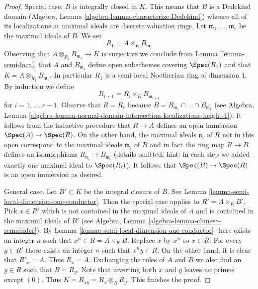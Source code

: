 \begin{proof}
Special case: $B$ is integrally closed in $K$. This means that
$B$ is a Dedekind domain
(Algebra, Lemma \ref{algebra-lemma-characterize-Dedekind})
whence all of its localizations at maximal ideals are discrete valuation rings.
Let $\mathfrak m_1, \ldots, \mathfrak m_r$ be the maximal ideals of
$B$. We set
$$
R_1 = A \times_K B_{\mathfrak m_1}
$$
Observing that $A \otimes_{R_1} B_{\mathfrak m_1} \to K$ is surjective
we conclude from Lemma \ref{lemma-semi-local} that $A$ and
$B_{\mathfrak m_1}$ define open subschemes covering $\Spec(R_1)$ and that
$K = A \otimes_{R_1} B_{\mathfrak m_1}$. In particular $R_1$ is a
semi-local Noetherian ring of dimension $1$. By induction we define
$$
R_{i + 1} = R_i \times_K B_{\mathfrak m_{i + 1}}
$$
for $i = 1, \ldots, r - 1$. Observe that $R = R_r$ because
$B = B_{\mathfrak m_1} \cap \ldots \cap B_{\mathfrak m_r}$ (see
Algebra, Lemma
\ref{algebra-lemma-normal-domain-intersection-localizations-height-1}).
It follows from the inductive procedure that $R \to A$ defines an
open immersion $\Spec(A) \to \Spec(R)$. On the other hand, the
maximal ideals $\mathfrak n_i$ of $R$ not in this open correspond
to the maximal ideals $\mathfrak m_i$ of $B$ and in fact
the ring map $R \to B$ defines an isomorphisms
$R_{\mathfrak n_i} \to B_{\mathfrak m_i}$ (details omitted; hint:
in each step we added exactly one maximal ideal to $\Spec(R_i)$).
It follows that $\Spec(B) \to \Spec(R)$ is an open immersion
as desired.

\medskip\noindent
General case. Let $B' \subset K$ be the integral closure of $B$.
See Lemma \ref{lemma-semi-local-dimension-one-conductor}.
Then the special case applies to $R' = A \times_K B'$.
Pick $x \in R'$ which is not contained in the maximal
ideals of $A$ and is contained in the maximal ideals of $B'$
(see Algebra, Lemma \ref{algebra-lemma-chinese-remainder}).
By Lemma \ref{lemma-semi-local-dimension-one-conductor}
there exists an integer $n$ such that $x^n \in R = A \times_K B$.
Replace $x$ by $x^n$ so $x \in R$. For every $y \in R'$ there exists
an integer $n$ such that $x^n y \in R$. On the other hand,
it is clear that $R'_x = A$. Thus $R_x = A$.
Exchanging the roles of $A$ and $B$ we also find an $y \in R$
such that $B = R_y$. Note that inverting both $x$ and $y$
leaves no primes except $(0)$. Thus $K = R_{xy} = R_x \otimes_R R_y$.
This finishes the proof.
\end{proof}


